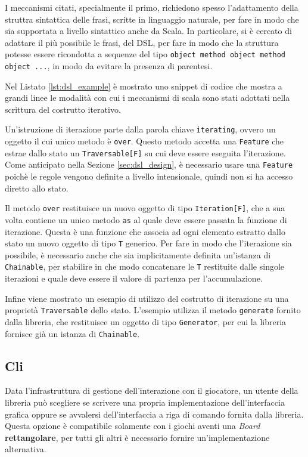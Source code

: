 I meccanismi citati, specialmente il primo, richiedono spesso l'adattamento della struttra sintattica delle frasi, scritte in linguaggio naturale, per fare in modo che sia supportata a livello sintattico anche da Scala.
%
In particolare, si è cercato di adattare il più possibile le frasi, del DSL, per fare in modo che la struttura potesse essere ricondotta a sequenze del tipo \texttt{object method object method object ...}, in modo da evitare la presenza di parentesi.

Nel Listato \ref{lst:dsl_example} è mostrato uno snippet di codice che mostra a grandi linee le modalità con cui i meccanismi di scala sono stati adottati nella scrittura del costrutto iterativo.
%

%
Un'istruzione di iterazione parte dalla parola chiave \texttt{iterating}, ovvero un oggetto il cui unico metodo è \texttt{over}.
%
Questo metodo accetta una \texttt{Feature} che estrae dallo stato un \texttt{Traversable[F]} su cui deve essere eseguita l'iterazione.
%
Come anticipato nella Sezione \ref{sec:dsl_design}, è necessario usare una \texttt{Feature} poichè le regole vengono definite a livello intensionale, quindi non si ha accesso diretto allo stato.

Il metodo \texttt{over} restituisce un nuovo oggetto di tipo \texttt{Iteration[F]}, che a sua volta contiene un unico metodo \texttt{as} al quale deve essere passata la funzione di iterazione.
%
Questa è una funzione che associa ad ogni elemento estratto dallo stato un nuovo oggetto di tipo \texttt{T} generico.
%
Per fare in modo che l'iterazione sia possibile, è necessario anche che sia implicitamente definita un'istanza di \texttt{Chainable}, per stabilire in che modo concatenare le \texttt{T} restituite dalle singole iterazioni e quale deve essere il valore di partenza per l'accumulazione.

Infine viene mostrato un esempio di utilizzo del costrutto di iterazione su una proprietà \texttt{Traversable} dello stato.
%
L'esempio utilizza il metodo \texttt{generate} fornito dalla libreria, che restituisce un oggetto di tipo \texttt{Generator}, per cui la libreria fornisce già un istanza di \texttt{Chainable}.


\subsection{Cli}
Data l'infrastruttura di gestione dell'interazione con il giocatore, un utente della libreria può scegliere se scrivere una propria implementazione dell'interfaccia grafica oppure se avvalersi dell'interfaccia a riga di comando fornita dalla libreria.
%
Questa opzione è compatibile solamente con i giochi aventi una \textit{Board} \textbf{rettangolare}, per tutti gli altri è necessario fornire un'implementazione alternativa.

